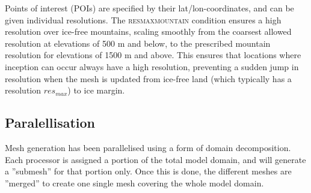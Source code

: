 \documentclass{article}
\begin{document}
Points of interest (POIs) are specified by their lat/lon-coordinates, and can be given individual resolutions. The \textsc{res\textunderscore max\textunderscore mountain} condition ensures a high resolution over ice-free mountains, scaling smoothly from the coarsest allowed resolution at elevations of 500 m and below, to the prescribed mountain resolution for elevations of 1500 m and above. This ensures that locations where inception can occur always have a high resolution, preventing a sudden jump in resolution when the mesh is updated from ice-free land (which typically has a resolution $res_{max}$) to ice margin.


\newpage
\subsection{Paralellisation}

Mesh generation has been parallelised using a form of domain decomposition. Each processor is assigned a portion of the total model domain, and will generate a ''submesh'' for that portion only. Once this is done, the different meshes are ''merged'' to create one single mesh covering the whole model domain.
\end{document}
